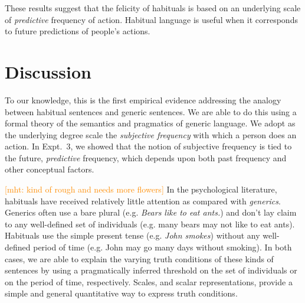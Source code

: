 \documentclass[10pt,letterpaper]{article}
\newcommand{\mht}[1]{\textcolor{DarkOrange}{[mht: #1]}}
\begin{document}
%
%
%
%

These results suggest that the felicity of habituals is based on an underlying scale of \emph{predictive} frequency of action.
Habitual language is useful when it corresponds to future predictions of people's actions.



\section{Discussion}

To our knowledge, this is the first empirical evidence addressing the analogy between habitual sentences and generic sentences.
We are able to do this using a formal theory of the semantics and pragmatics of generic language.
We adopt as the underlying degree scale the \emph{subjective frequency} with which a person does an action. 
In Expt.~3, we showed that the notion of subjective frequency is tied to the future, \emph{predictive} frequency, which depends upon both past frequency and other conceptual factors.

\mht{kind of rough and needs more flowers}
In the psychological literature, habituals have received relatively little attention as compared with \emph{generics}. 
Generics often use a bare plural (e.g. \emph{Bears like to eat ants.}) and don't lay claim to any well-defined set of individuals (e.g. many bears may not like to eat ants).
Habituals use the simple present tense (e.g. \emph{John smokes}) without any well-defined period of time (e.g. John may go many days without smoking). 
In both cases, we are able to explain the varying truth conditions of these kinds of sentences by using a pragmatically inferred threshold on the set of individuals or on the period of time, respectively. 
Scales, and scalar representations, provide a simple and general quantitative way to express truth conditions.
\end{document}
